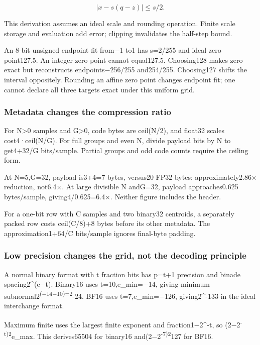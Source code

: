 \[
\left|x-s(q-z)\right|\le s/2.
\]

This derivation assumes an ideal scale and rounding operation. Finite scale storage and evaluation add error; clipping invalidates the half-step bound.

An 8-bit unsigned endpoint fit from−1 to1 has s=2/255 and ideal zero point127.5. An integer zero point cannot equal127.5. Choosing128 makes zero exact but reconstructs endpoints−256/255 and254/255. Choosing127 shifts the interval oppositely. Rounding an affine zero point changes endpoint fit; one cannot declare all three targets exact under this uniform grid.

\subsubsection{Metadata changes the compression ratio}\label{metadata-changes-the-compression-ratio}

For N\textgreater0 samples and G\textgreater0, code bytes are ceil(N/2), and float32 scales cost4·ceil(N/G). For full groups and even N, divide payload bits by N to get4+32/G bits/sample. Partial groups and odd code counts require the ceiling form.

At N=5,G=32, payload is3+4=7 bytes, versus20 FP32 bytes: approximately2.86× reduction, not6.4×. At large divisible N andG=32, payload approaches0.625 bytes/sample, giving4/0.625=6.4×. Neither figure includes the header.

For a one-bit row with C samples and two binary32 centroids, a separately packed row costs ceil(C/8)+8 bytes before its other metadata. The approximation1+64/C bits/sample ignores final-byte padding.

\subsubsection{Low precision changes the grid, not the decoding principle}\label{low-precision-changes-the-grid-not-the-decoding-principle}

A normal binary format with t fraction bits has p=t+1 precision and binade spacing2\^{}(e−t). Binary16 uses t=10,e\_min=−14, giving minimum subnormal2\textsuperscript{(−14−10)=2}-24. BF16 uses t=7,e\_min=−126, giving2\^{}-133 in the ideal interchange format.

Maximum finite uses the largest finite exponent and fraction1−2\^{}-t, so (2−2\textsuperscript{-t)2}e\_max. This derives65504 for binary16 and(2−2\textsuperscript{-7)2}127 for BF16.

